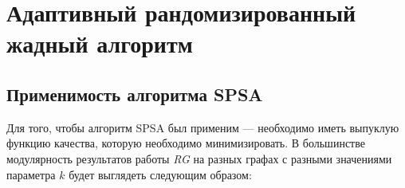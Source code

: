 
\section{Адаптивный рандомизированный жадный алгоритм}



\subsection{Применимость алгоритма SPSA}

Для того, чтобы алгоритм SPSA был применим --- необходимо иметь выпуклую функцию качества, которую необходимо минимизировать. В большинстве модулярность результатов работы \emph{RG} на разных графах с разными значениями параметра $k$ будет выглядеть следующим образом:

